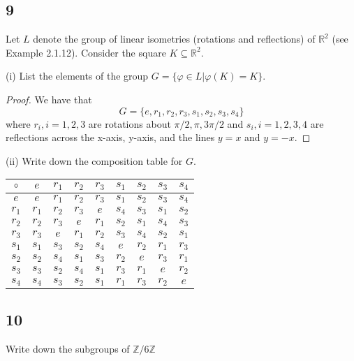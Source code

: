 \documentclass{article}
\newcommand{\Z}{\mathbb{Z}}
\newcommand{\R}{\mathbb{R}}
\begin{document}
\subsection*{9}
Let $L$ denote the group of linear isometries (rotations and reflections) of
$\R^2$ (see Example 2.1.12). Consider the square $K \subseteq \R^2$.

(i) List the elements of the group $G = \{\varphi \in L | \varphi(K) = K\}$.
\begin{proof}
    We have that
    \begin{equation*}
        G = \{e, r_1, r_2, r_3, s_1, s_2, s_3, s_4\}
    \end{equation*}
    where $r_i, i = 1,2,3$ are rotations about $\pi/2, \pi, 3\pi/2$ and
    $s_i, i = 1,2,3,4$ are reflections across the x-axis, y-axis, and the
    lines $y = x$ and $y = -x$.
\end{proof}

(ii) Write down the composition table for $G$.

\begin{center}
    \begin{tabular}{c | c c c c c c c c}
        $\circ$ & $e$   & $r_1$ & $r_2$ & $r_3$ & $s_1$ & $s_2$ & $s_3$ & $s_4$ \\
        \hline
        $e$     & $e$   & $r_1$ & $r_2$ & $r_3$ & $s_1$ & $s_2$ & $s_3$ & $s_4$ \\
        $r_1$   & $r_1$ & $r_2$ & $r_3$ & $e$   & $s_4$ & $s_3$ & $s_1$ & $s_2$ \\
        $r_2$   & $r_2$ & $r_3$ & $e$   & $r_1$ & $s_2$ & $s_1$ & $s_4$ & $s_3$ \\
        $r_3$   & $r_3$ & $e$   & $r_1$ & $r_2$ & $s_3$ & $s_4$ & $s_2$ & $s_1$ \\
        $s_1$   & $s_1$ & $s_3$ & $s_2$ & $s_4$ & $e$   & $r_2$ & $r_1$ & $r_3$ \\
        $s_2$   & $s_2$ & $s_4$ & $s_1$ & $s_3$ & $r_2$ & $e$   & $r_3$ & $r_1$ \\
        $s_3$   & $s_3$ & $s_2$ & $s_4$ & $s_1$ & $r_3$ & $r_1$ & $e$   & $r_2$ \\
        $s_4$   & $s_4$ & $s_3$ & $s_2$ & $s_1$ & $r_1$ & $r_3$ & $r_2$ & $e$   \\
    \end{tabular}
\end{center}

\subsection*{10}
Write down the subgroups of $\Z/6\Z$
\end{document}
